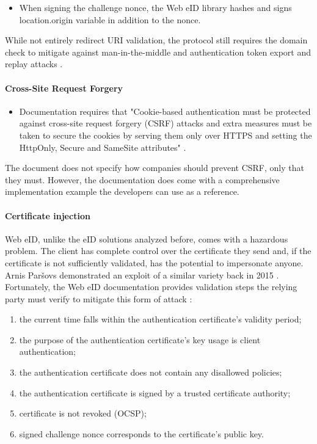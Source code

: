 \begin{itemize}
  \item When signing the challenge nonce, the Web eID library hashes and signs {location.origin} variable in addition to the nonce.
\end{itemize}

While not entirely redirect URI validation, the protocol still requires the domain check to mitigate against man-in-the-middle and authentication token export and replay attacks \cite{ria-webeid-systemarchitecture}.

\paragraph{Cross-Site Request Forgery}

\begin{itemize}
  \item Documentation requires that "Cookie-based authentication must be protected against cross-site request forgery (CSRF) attacks and extra measures must be taken to secure the cookies by serving them only over HTTPS and setting the HttpOnly, Secure and SameSite attributes" \cite{ria-webeid-source-web-eid-authtoken-validation-java-readme}.
\end{itemize}

The document does not specify how companies should prevent CSRF, only that they must. However, the documentation does come with a comprehensive implementation example the developers can use as a reference.

\paragraph{Certificate injection}

Web eID, unlike the eID solutions analyzed before, comes with a hazardous problem. The client has complete control over the certificate they send and, if the certificate is not sufficiently validated, has the potential to impersonate anyone. Arnis Paršovs demonstrated an exploit of a similar variety back in 2015 \cite{seb-auth-bypass}. Fortunately, the Web eID documentation provides validation steps the relying party must verify to mitigate this form of attack \cite{ria-webeid-systemarchitecture}:

\begin{enumerate}
  \item the current time falls within the authentication certificate's validity period;
  \item the purpose of the authentication certificate's key usage is client authentication;
  \item the authentication certificate does not contain any disallowed policies;
  \item the authentication certificate is signed by a trusted certificate authority;
  \item certificate is not revoked (OCSP);
  \item signed challenge nonce corresponds to the certificate's public key.
\end{enumerate}

